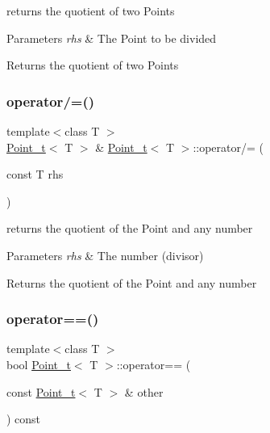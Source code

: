 returns the quotient of two Points 


\begin{DoxyParams}{Parameters}
{\em rhs} & The Point to be divided\\
\hline
\end{DoxyParams}
\begin{DoxyReturn}{Returns}
the quotient of two Points 
\end{DoxyReturn}
\mbox{\label{class_point__t_a9035ca1de1358b7447d1c04a00c0b08e}} 
\subsubsection{\texorpdfstring{operator/=()}{operator/=()}\hspace{0.1cm}{\footnotesize\ttfamily [2/2]}}
{\footnotesize\ttfamily template$<$class T $>$ \\
\hyperlink{class_point__t}{Point\+\_\+t}$<$ T $>$ \& \hyperlink{class_point__t}{Point\+\_\+t}$<$ T $>$\+::operator/= (\begin{DoxyParamCaption}\item[{const T}]{rhs }\end{DoxyParamCaption})}



returns the quotient of the Point and any number 


\begin{DoxyParams}{Parameters}
{\em rhs} & The number (divisor)\\
\hline
\end{DoxyParams}
\begin{DoxyReturn}{Returns}
the quotient of the Point and any number 
\end{DoxyReturn}
\mbox{\label{class_point__t_aa9e7b08f004641102956f486c18e79b7}} 
\subsubsection{\texorpdfstring{operator==()}{operator==()}}
{\footnotesize\ttfamily template$<$class T $>$ \\
bool \hyperlink{class_point__t}{Point\+\_\+t}$<$ T $>$\+::operator== (\begin{DoxyParamCaption}\item[{const \hyperlink{class_point__t}{Point\+\_\+t}$<$ T $>$ \&}]{other }\end{DoxyParamCaption}) const}



